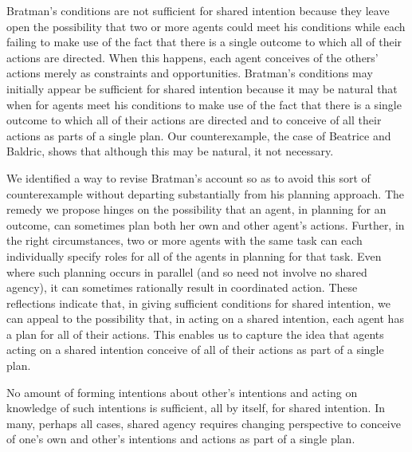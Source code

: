 \documentclass[12pt,\papersize]{extarticle}
\begin{document}
Bratman's conditions are not sufficient for shared intention because they leave open the possibility that two or more agents could meet his conditions while each failing to make use of the fact that there is a single outcome to which all of their actions are directed.
When this happens, each agent conceives of the others' actions merely as constraints and opportunities.
Bratman's conditions may initially appear be sufficient for shared intention because it may be natural that when for agents meet his conditions to make use of the fact that there is a single outcome to which all of their actions are directed and  to conceive of all their actions as parts of a single plan. 
Our counterexample, the case of Beatrice and Baldric, shows that although this may be natural, it not necessary.

We identified a way to revise Bratman's account so as to avoid this sort of counterexample without departing substantially from his planning approach.
The remedy we propose hinges on the possibility that an agent, in planning for an outcome, can sometimes plan both her own and other agent's actions.
Further, in the right circumstances,
two or more agents with the same task
	can each individually specify roles for all of the agents in planning for that task.
Even where such planning occurs in parallel (and so need not involve no shared agency),  it can sometimes rationally result in coordinated action.
These reflections indicate that, in giving sufficient conditions for shared intention, we can appeal to the possibility that, in acting on a shared intention, each agent has a plan for all of their actions.
This enables us to capture the idea that agents acting on a shared intention conceive of all of their actions as part of a single plan.

No amount of forming intentions about other's intentions and acting on knowledge of such intentions is sufficient, all by itself, for shared intention.  
In many, perhaps all cases, shared agency requires changing perspective 
to conceive of one's own and other's intentions and actions as part of a single plan.



\end{document}
